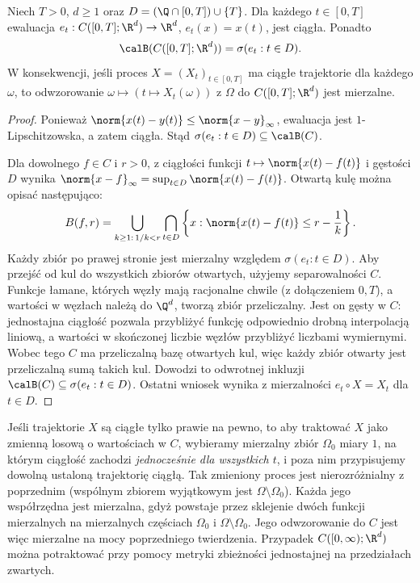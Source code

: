 \begin{twierdzenie}
Niech $T>0$, $d\ge1$ oraz
$D=(\Q\cap[0,T])\cup\{T\}$.
Dla każdego $t\in[0,T]$ ewaluacja
$e_t:C([0,T];\R^d)\to\R^d$, $e_t(x)=x(t)$,
jest ciągła. Ponadto
\[
\calB(C([0,T];\R^d))=\sigma(e_t:t\in D).
\]
W konsekwencji, jeśli proces $X=(X_t)_{t\in[0,T]}$
ma ciągłe trajektorie dla każdego $\omega$, to odwzorowanie
$\omega\mapsto(t\mapsto X_t(\omega))$ z $\Omega$ do
$C([0,T];\R^d)$ jest mierzalne.
\end{twierdzenie}
\begin{proof}
Ponieważ $\norm{x(t)-y(t)}\le\norm{x-y}_\infty$,
ewaluacja jest $1$-Lipschitzowska, a zatem ciągła.
Stąd $\sigma(e_t:t\in D)\subseteq\calB(C)$.

Dla dowolnego $f\in C$ i $r>0$, z ciągłości funkcji
$t\mapsto\norm{x(t)-f(t)}$ i gęstości $D$ wynika
$\norm{x-f}_\infty=\sup_{t\in D}\norm{x(t)-f(t)}$.
Otwartą kulę można opisać następująco:
\[
B(f,r)=\bigcup_{k\ge1:\,1/k<r}
\bigcap_{t\in D}
\left\{x:\norm{x(t)-f(t)}\le r-\frac1k\right\}.
\]
Każdy zbiór po prawej stronie jest mierzalny względem
$\sigma(e_t:t\in D)$. Aby przejść od kul do wszystkich
zbiorów otwartych, użyjemy separowalności $C$.
Funkcje łamane, których węzły mają racjonalne chwile
(z dołączeniem $0,T$), a wartości w węzłach należą do
$\Q^d$, tworzą zbiór przeliczalny. Jest on gęsty w
$C$: jednostajna ciągłość pozwala przybliżyć funkcję
odpowiednio drobną interpolacją liniową, a wartości
w skończonej liczbie węzłów przybliżyć liczbami wymiernymi.
Wobec tego $C$ ma przeliczalną bazę otwartych kul,
więc każdy zbiór otwarty jest przeliczalną sumą takich kul.
Dowodzi to odwrotnej inkluzji $\calB(C)\subseteq\sigma(e_t:t\in D)$.
Ostatni wniosek wynika z mierzalności $e_t\circ X=X_t$
dla $t\in D$.
\end{proof}

\begin{uwaga}
Jeśli trajektorie $X$ są ciągłe tylko prawie na pewno,
to aby traktować $X$ jako zmienną losową o wartościach w $C$,
wybieramy mierzalny zbiór $\Omega_0$ miary $1$, na którym
ciągłość zachodzi \emph{jednocześnie dla wszystkich $t$},
i poza nim przypisujemy dowolną ustaloną trajektorię ciągłą.
Tak zmieniony proces jest nierozróżnialny z poprzednim
(wspólnym zbiorem wyjątkowym jest $\Omega\setminus\Omega_0$).
Każda jego współrzędna jest mierzalna, gdyż powstaje przez
sklejenie dwóch funkcji mierzalnych na mierzalnych częściach
$\Omega_0$ i $\Omega\setminus\Omega_0$. Jego odwzorowanie
do $C$ jest więc mierzalne na mocy poprzedniego twierdzenia.
Przypadek $C([0,\infty);\R^d)$ można potraktować przy pomocy
metryki zbieżności jednostajnej na przedziałach zwartych.
\end{uwaga}



